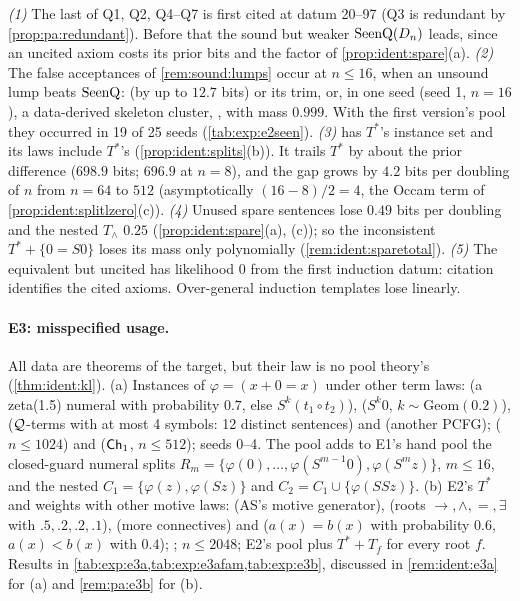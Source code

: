 \noindent\emph{(1)} The last of Q1, Q2, Q4--Q7 is first cited at datum 20--97 (Q3 is redundant by \cref{prop:pa:redundant}). Before that the sound but weaker $\mathrm{SeenQ}(D_n)$ leads, since an uncited axiom costs its prior bits and the factor of \cref{prop:ident:spare}(a).
\emph{(2)} The false acceptances of \cref{rem:sound:lumps} occur at $n\le16$, when an unsound lump beats $\mathrm{SeenQ}$:  (by up to $12.7$ bits) or its trim, or, in one seed (seed 1, $n=16$), a data-derived skeleton cluster, , with mass $0.999$. With the first version's pool they occurred in 19 of 25 seeds (\cref{tab:exp:e2seen}).
\emph{(3)}  has $T^*$'s instance set and its laws include $T^*$'s (\cref{prop:ident:splits}(b)). It trails $T^*$ by about the prior difference ($698.9$ bits; $696.9$ at $n=8$), and the gap grows by $4.2$ bits per doubling of $n$ from $n=64$ to $512$ (asymptotically $(16-8)/2=4$, the Occam term of \cref{prop:ident:splitlzero}(c)).
\emph{(4)} Unused spare sentences lose $0.49$ bits per doubling and the nested $T_\wedge$ $0.25$ (\cref{prop:ident:spare}(a), (c)); so the inconsistent $T^*+\{0=S0\}$ loses its mass only polynomially (\cref{rem:ident:sparetotal}).
\emph{(5)} The equivalent but uncited  has likelihood $0$ from the first induction datum: citation identifies the cited axioms. Over-general induction templates lose linearly.

\paragraph{E3: misspecified usage.}
All data are theorems of the target, but their law is no pool theory's (\cref{thm:ident:kl}).
(a) Instances of $\varphi=(x+0=x)$ under other term laws:  (a zeta(1.5) numeral with probability $0.7$, else $S^k(t_1\circ t_2)$),  ($S^k0$, $k\sim\mathrm{Geom}(0.2)$),  ($\mathcal{Q}$-terms with at most 4 symbols: 12 distinct sentences) and  (another PCFG); \Lzero{} ($n\le1024$) and \Lone{} ($\mathsf{Ch}_{1}$, $n\le512$); seeds 0--4. The pool adds to E1's hand pool the closed-guard numeral splits $R_m=\{\varphi(0),\dots,\varphi(S^{m-1}0),\varphi(S^mz)\}$, $m\le16$, and the nested $C_1=\{\varphi(z),\varphi(Sz)\}$ and $C_2=C_1\cup\{\varphi(SSz)\}$.
(b) E2's $T^*$ and weights with other motive laws:  (AS's motive generator),  (roots $\to,\wedge,=,\exists$ with $.5,.2,.2,.1$),  (more connectives) and  ($a(x)=b(x)$ with probability $0.6$, $a(x)<b(x)$ with $0.4$); \Lzero; $n\le2048$; E2's pool plus $T^*+T_f$ for every root $f$. Results in \cref{tab:exp:e3a,tab:exp:e3afam,tab:exp:e3b}, discussed in \cref{rem:ident:e3a} for (a) and \cref{rem:pa:e3b} for (b).

